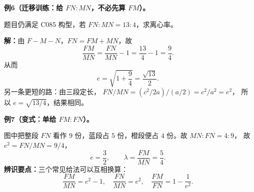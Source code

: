 \clearpage
\begin{examplebox}
\textbf{例6（迁移训练：给 $FN:MN$，不必先算 $FM$）。}

题目仍满足 C085 构型，若 $FN:MN=13:4$，求离心率。

\textbf{解：}由 $F-M-N$，$FN=FM+MN$，故
\[
\frac{FM}{MN}=\frac{FN}{MN}-1=\frac{13}{4}-1=\frac94.
\]
从而
\[
\boxed{e=\sqrt{1+\frac94}=\frac{\sqrt{13}}2}.
\]
另一条更短的路：由三段定长，
$FN/MN=(c^2/2a)/(a/2)=c^2/a^2=e^2$，
所以 $e=\sqrt{13/4}$，结果相同。

\medskip
\textbf{例7（变式：单给 $FM:FN$）。}

\begin{center}\end{center}

图中把整段 $FN$ 看作 $9$ 份，蓝段占 $5$ 份，橙段便占 $4$ 份。故 $MN:FN=4:9$，
故 $e^2=FN/MN=9/4$，
\[
\boxed{e=\frac32},\qquad
\boxed{\lambda=\frac{FM}{MN}=\frac54}.
\]
\textbf{辨识要点：}三个常见给法可以互相换算：
\[
\frac{FM}{MN}=e^2-1,\quad
\frac{FN}{MN}=e^2,\quad
\frac{FM}{FN}=1-\frac1{e^2}.
\]
\end{examplebox}
